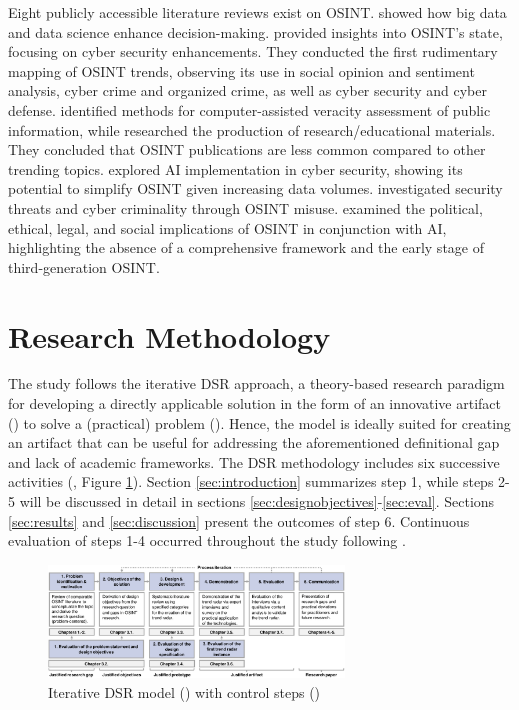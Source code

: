 \documentclass[10pt]{article}
\begin{document}
Eight publicly accessible literature reviews exist on OSINT. \textcite{DosPassos.2017} showed how big data and data science enhance decision-making. \textcite{PastorGalindo.2019, PastorGalindo.2020}
provided insights into OSINT's state, focusing on cyber security
enhancements. They conducted the first rudimentary mapping of OSINT trends, observing its use in social opinion and sentiment
analysis, cyber crime and organized crime, as well as cyber security and cyber defense. \textcite{GarciaLozano.2020} identified methods for computer-assisted veracity assessment of public information, while
\textcite{HerreraCubides.2020} researched the production of research/educational materials. They concluded that OSINT
publications are less common compared to other trending topics. \textcite{Yogish.2021} explored AI  implementation in cyber security, showing its potential to simplify OSINT given increasing data volumes.
\textcite{Hwang.2022} investigated security threats and cyber criminality through OSINT misuse.
\textcite{Ghioni.2023} examined the political, ethical, legal, and social implications of
OSINT in conjunction with AI, highlighting the absence of a comprehensive framework and the early stage of third-generation OSINT.

\section{Research Methodology}

The study follows the iterative DSR approach, a theory-based research paradigm for developing a directly applicable solution in the form of an innovative artifact (\cite{vomBrocke.2020b})
to solve a (practical) problem (\cite{Peffers.2007}). Hence, the model is ideally suited for creating an artifact that can be useful for addressing the aforementioned definitional gap and lack of academic frameworks. The DSR methodology includes
six successive activities (\cite{Peffers.2007}, Figure \ref{fig: DSRM}). Section \ref{sec:introduction} summarizes step 1, while steps 2-5 will be discussed in detail in sections \ref{sec:designobjectives}-\ref{sec:eval}. Sections \ref{sec:results} and \ref{sec:discussion} present the outcomes of step 6. Continuous evaluation of steps 1-4 occurred throughout the study following \textcite{Sonnenberg.2012}.

\begin{figure}[thb]
    \centering
    \includegraphics[width=0.7\textwidth]{PDF/images/cropped DSR_V01.pdf}
    \caption{Iterative DSR model (\cite{Peffers.2007}) with control steps (\cite{Sonnenberg.2012})}
    \label{fig: DSRM}
\end{figure}
\end{document}
